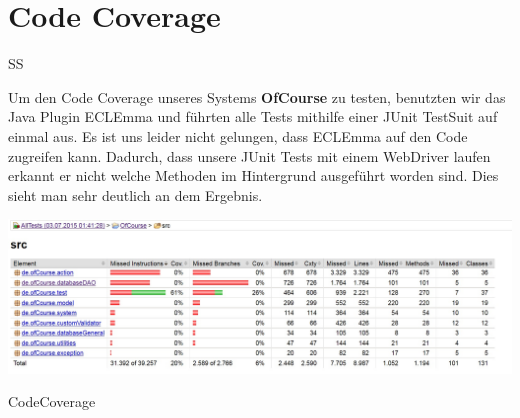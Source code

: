 \chapter{Code Coverage}
\begin{tiny}
	SS
\end{tiny}


Um den Code Coverage unseres Systems \textbf{OfCourse} zu testen, benutzten wir das Java Plugin ECLEmma und führten alle Tests mithilfe einer JUnit TestSuit auf einmal aus.
Es ist uns leider nicht gelungen, dass ECLEmma auf den Code zugreifen kann. Dadurch, dass unsere JUnit Tests mit einem WebDriver laufen erkannt er nicht welche Methoden im Hintergrund ausgeführt worden sind. 
Dies sieht man sehr deutlich an dem Ergebnis.

\centering
\includegraphics[width=1\linewidth]{img/CodeCoverage}
\caption{CodeCoverage}
\label{fig:CodeCoverage}